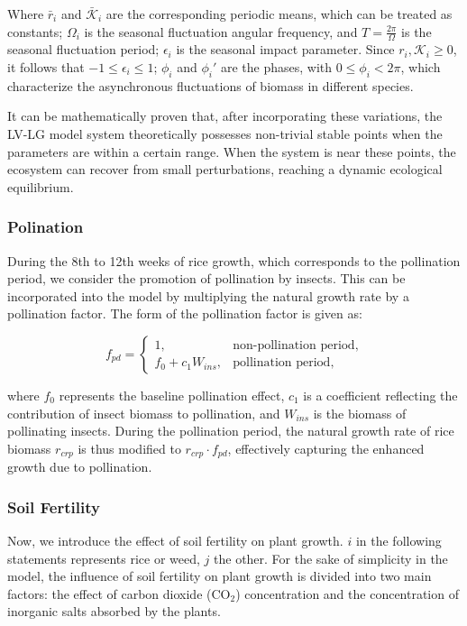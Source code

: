\documentclass{HZNUMCM}
\begin{document}
        Where $\bar{r}_i$ and $\bar{\mathscr{K}}_i$ are the corresponding periodic means, 
        which can be treated as constants; $\Omega_i$ is the seasonal fluctuation angular frequency, 
        and $T = \frac{2\pi}{\Omega}$ is the seasonal fluctuation period; 
        $\epsilon_i$ is the seasonal impact parameter. Since $r_i, \mathscr{K}_i \geqslant 0$, 
        it follows that $-1 \leqslant \epsilon_i \leqslant 1$; $\phi_i$ and $\phi_i'$ are the phases, 
        with $0 \leqslant \phi_i < 2\pi$, which characterize the asynchronous fluctuations of biomass in different species.

        It can be mathematically proven that, after incorporating these variations, 
        the LV-LG model system theoretically possesses non-trivial stable points when the parameters are within a certain range. 
        When the system is near these points, the ecosystem can recover from small perturbations, 
        reaching a dynamic ecological equilibrium.
      \subsubsection{Polination}
        During the 8th to 12th weeks of rice growth, which corresponds to the pollination period, we consider the promotion of pollination by insects. This can be incorporated into the model by multiplying the natural growth rate by a pollination factor. The form of the pollination factor is given as:

        \[
        f_{pd} =
        \begin{cases}
        1, & \text{non-pollination period}, \\
        f_0 + c_1 W_{ins}, & \text{pollination period},
        \end{cases}
        \]
        
        where \( f_0 \) represents the baseline pollination effect, \( c_1 \) is a coefficient reflecting the contribution of insect biomass to pollination, and \( W_{ins} \) is the biomass of pollinating insects. During the pollination period, the natural growth rate of rice biomass \( r_{crp} \) is thus modified to \( r_{crp} \cdot f_{pd} \), effectively capturing the enhanced growth due to pollination.
      
      \subsubsection{Soil Fertility}
        Now, we introduce the effect of soil fertility on plant growth.
        $i$ in the following statements represents rice or weed, $j$ the other.
        For the sake of simplicity in the model, 
        the influence of soil fertility on plant growth is divided into two main factors: 
        the effect of carbon dioxide (CO$_2$) concentration and the concentration of inorganic salts absorbed by the plants.
\end{document}
